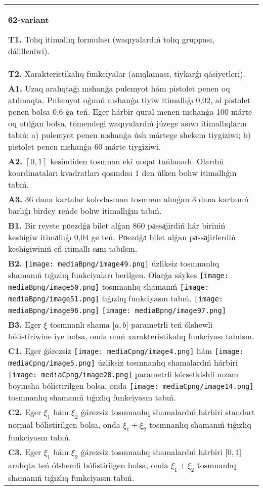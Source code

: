 \documentclass{article}
\begin{document}
\begin{tabular}{m{17cm}}
\textbf{62-variant}
\newline

\textbf{T1.} Tolıq itimallıq formulası (waqıyalardıń tolıq gruppası, dálilleniwi).
 \\
\textbf{T2.} Xarakteristikalıq funkciyalar (anıqlaması, tiykarǵı qásiyetleri).
 \\
\textbf{A1.} Uzaq aralıqtaǵı nıshanǵa pulemyot hám pistolet penen oq atılmaqta. Pulemyot oǵınıń nıshanǵa tiyiw itimallıǵı 0,02, al pistolet penen bolsa 0,6 ǵa teń. Eger hárbir qural menen nıshanǵa 100 márte oq atılǵan bolsa, tómendegi waqıyalardıń júzege asıwı itimallıqların tabıń: a) pulemyot penen nıshanǵa úsh mártege shekem tiygiziwi; b) pistolet penen nıshanǵa 60 márte tiygiziwi.
 \\
\textbf{A2.} $\left[ 0,1 \right]$ kesindiden tosınnan eki noqat  tańlanadı. Olardıń koordinataları kvadratları qosındısı 1 den úlken bolıw itimallıǵın tabıń.
 \\
\textbf{A3.} 36 dana kartalar kolodasınan tosınnan alınǵan 3 dana kartanıń barlıǵı birdey reńde bolıw itimallıǵın tabıń.
 \\
\textbf{B1.} Bir reyste pоezdǵа bilet alǵan 860 pаssаjirdiń hár biriniń keshigiw itimаllıǵı 0,04 ge teń. Pоezdǵа bilet alǵan pаssаjirlerdiń keshigiwiniń eń itimallı sаnı tabılsın.
 \\
\textbf{B2.} \texttt{[image: mediaBpng/image49.png]} úzliksiz tosınnanlıq shamanıń tıǵızlıq funkciyaları berilgen. Olarǵa sáykes \texttt{[image: mediaBpng/image50.png]} tosınnanlıq shamanıń \texttt{[image: mediaBpng/image51.png]} tıǵızlıq funkciyasın tabıń. \texttt{[image: mediaBpng/image96.png]} \texttt{[image: mediaBpng/image97.png]}
 \\
\textbf{B3.} Eger \(\xi\) tosınnanlı shama \(\lbrack a,b\rbrack\) parametrli teń ólshewli bólistiriwine iye bolsa, onda onıń xarakteristikalıq funkciyası tabılsın.
 \\
\textbf{C1.} Eger ǵárezsiz \texttt{[image: mediaCpng/image4.png]} hám \texttt{[image: mediaCpng/image5.png]} úzliksiz tosınnanlıq shamalardıń hárbiri \texttt{[image: mediaCpng/image28.png]} parametrli kórsetkishli nızam boyınsha bólistirilgen bolsa, onda \texttt{[image: mediaCpng/image14.png]} tosınnanlıq shamanıń tıǵızlıq funkciyasın tabıń.
 \\
\textbf{C2.} Eger \(\xi_{1}\) hám \(\xi_{2}\) ǵárezsiz tosınnanlıq shamalardıń hárbiri standart normal bólistirilgen bolsa, onda \(\xi_{1} + \xi_{2}\) tosınnanlıq shamanıń tıǵızlıq funkciyasın tabıń.
 \\
\textbf{C3.} Eger \(\xi_{1}\) hám \(\xi_{2}\) ǵárezsiz tosınnanlıq shamalardıń hárbiri \(\lbrack 0,1\rbrack\) aralıqta teń ólshemli bólistirilgen bolsa, onda \(\xi_{1} + \xi_{2}\) tosınnanlıq shamanıń tıǵızlıq funkciyasın tabıń.
 \\

\end{tabular}
\end{document}
